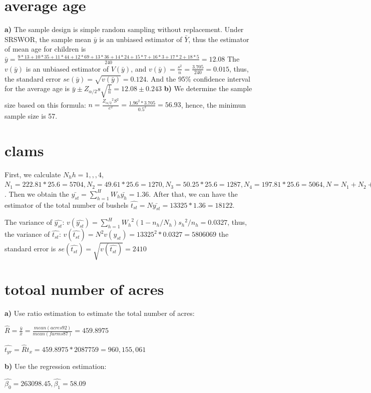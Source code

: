 \documentclass[11pt]{article}
\begin{document}
\section{average age}
\label{sec:2}
\textbf{a)} The sample design is simple random sampling without replacement. Under SRSWOR, the sample mean $\bar{y}$ is an unbiased estimator of $\bar{Y}$, thus the estimator of mean age for children is $\bar{y} = \frac{9*13 + 10*35 + 11*44 + 12*69 + 13*36 + 14*24 + 15*7 + 16*3 + 17*2 + 18*5}{240} = 12.08$
The $v(\bar{y})$ is an unbiased estimator of $V(\bar{y})$, and $v(\bar{y}) = \frac{s^2}{n} = \frac{3.705}{240}  = 0.015$, thus, the standard error $se(\bar{y}) = \sqrt{v(\bar{y})} = 0.124$. And the 95\% confidence interval for the average age is $\bar{y} \pm Z_{\alpha/2}s\sqrt{\frac{1}{n}} = 12.08 \pm 0.243$
\textbf{b)} We determine the sample size based on this formula: $n = \frac{{Z_{\alpha/2}}^2S^2}{e^2} = \frac{1.96^2*3.705}{0.5^2} = 56.93$, hence, the minimun sample size is 57.

\section{clams}
\label{sec:3}
First, we calculate $N_h h = 1,,,4$, $N_1 = 222.81 * 25.6 = 5704, N_2 = 49.61 * 25.6 = 1270, N_3 = 50.25 * 25.6 = 1287, N_4 = 197.81 * 25.6 = 5064, N = N_1 + N_2 + N_3 + N_4 = 13325$. Then we obtain the $\bar{y_{st}} = \sum_{h=1}^{H}W_h\bar{y_h} = 1.36 $. After that, we can have the estimator of the total number of bushels $\hat{t_{st}} = N\bar{y_{st}} = 13325 * 1.36 = 18122$.

The variance of $\hat{y_{st}}$: $v(\hat{y_{st}}) = \sum_{h=1}^{H}{W_h}^2(1-n_h/N_h){s_h}^2/n_h = 0.0327$, thus, the variance of $\hat{t_{st}}$: $v(\hat{t_{st}}) = N^2v({y_{st}}) = 13325^2*0.0327 = 5806069$ the standard error is $se(\hat{t_{st}}) = \sqrt{v(\hat{t_{st}})} = 2410$

\section{totoal number of acres}
\textbf{a)}
Use ratio estimation to estimate the total number of acres:

$\hat{R} = \frac{\bar{y}}{\bar{x}} = \frac{mean(acres92)}{mean(farms87)} = 459.8975$

$\hat{t_{yr}} = \hat{R}t_{x} = 459.8975* 2087759 =  960,155,061$

\textbf{b)}
Use the regression estimation:

$\hat{\beta_0} = 263098.45, \hat{\beta_1} = 58.09$
\end{document}
